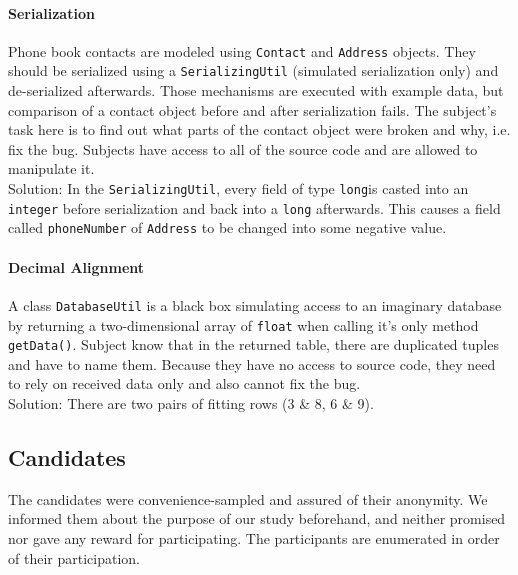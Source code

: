 \documentclass[english]{acm_proc_article-sp}
\begin{document}
\paragraph{Serialization}
Phone book contacts are modeled using \texttt{Contact} 
and \texttt{Address} 
objects. 
They should be serialized using a \texttt{SerializingUtil} (simulated serialization only) and de-serialized afterwards.
Those mechanisms are executed with example data, but comparison of a contact object before and after serialization fails. 
The subject's task here is to find out what parts of the contact object were broken and why, i.e. 
fix the bug. 
Subjects have access to all of the source code and are allowed to manipulate it.\\
Solution: In the \texttt{SerializingUtil}, every field of type \texttt{long}is casted into an \texttt{integer} before serialization and back into a \texttt{long} afterwards. 
This causes a field called \texttt{phoneNumber} of \texttt{Address} to be changed into some negative value.

\paragraph{Decimal Alignment}
A class \texttt{DatabaseUtil} is a black box simulating access to an imaginary database by returning a two-dimensional array of \texttt{float}  when calling it's only method \texttt{getData()}. 
Subject know that in the returned table, there are duplicated tuples and have to name them. 
Because they have no access to source code, they need to rely on received data only and also cannot fix the bug.\\
Solution: There are two pairs of fitting rows (3 \& 8, 6 \& 9).

\subsection{Candidates}
The candidates were convenience-sampled and assured of their anonymity. We informed them about the purpose of our study beforehand, and neither promised nor gave any reward for participating. The participants are enumerated in order of their participation.
\end{document}
